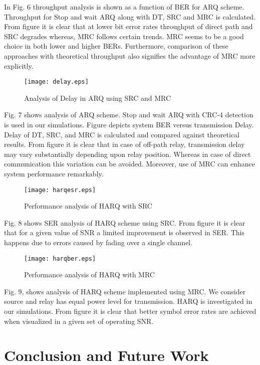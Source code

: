 \documentclass{sig-alternate}
\begin{document}
In Fig. 6 throughput analysis is shown as a function of BER for ARQ scheme. Throughput for Stop and wait ARQ along with DT, SRC and MRC is calculated. From figure it is clear that at lower bit error rates throughput of direct path and SRC degrades whereas, MRC follows certain trends. MRC seems to be a good choice in both lower and higher BERs. Furthermore, comparison of these approaches with theoretical throughput also signifies the advantage of MRC more explicitly.
\begin{figure}[!ht]
  \centering
  \texttt{[image: delay.eps]}
   \vspace{-.5cm}
  \caption{Analysis of Delay in ARQ using SRC and MRC}
\end{figure}
Fig. 7 shows analysis of ARQ scheme. Stop and wait ARQ with CRC-4 detection is used in our simulations. Figure depicts system BER versus transmission Delay. Delay of DT, SRC, and MRC is calculated and compared against theoretical results. From figure it is clear that in case of off-path relay, transmission delay may vary substantially depending upon relay position. Whereas in case of direct communication this variation can be avoided. Moreover, use of MRC can enhance system performance remarkably.

\begin{figure}[!ht]
  \centering
   \texttt{[image: harqesr.eps]}
     \vspace{-.5cm}
  \caption{Performance analysis of HARQ with SRC}
\end{figure}

Fig. 8 shows SER analysis of HARQ scheme using SRC. From figure it is clear that for a given value of SNR a limited improvement is observed  in SER. This happens due to errors caused by fading over a single channel.
\begin{figure}[!ht]
  \centering
  \texttt{[image: harqber.eps]}
   \vspace{-.5cm}
   \caption{Performance analysis of HARQ with MRC}
\end{figure}
Fig. 9, shows analysis of HARQ scheme implemented using MRC. We consider source and relay has equal power level for transmission.  HARQ is investigated in our simulations. From figure it is clear that better symbol error rates are achieved when visualized in a given set of operating SNR.

\section{Conclusion and Future Work}
\label{sec:majhead}
\end{document}
